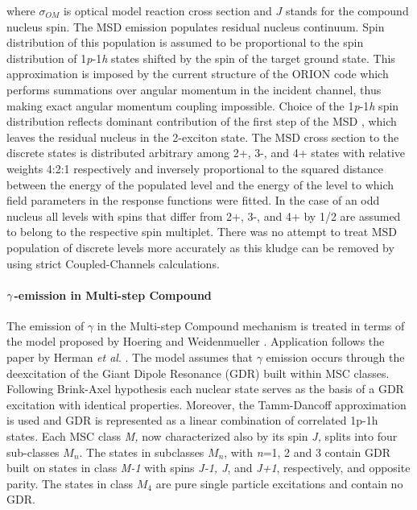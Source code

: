 \noindent where $\sigma_{OM}$ is optical model reaction cross section and $J$
stands for the compound nucleus spin. The MSD%
 emission populates residual nucleus continuum. Spin distribution
of this population is assumed to be proportional to the spin distribution of
1\emph{p}-1\emph{h} states shifted by the spin of the target ground state.
This approximation is imposed by the current structure of the ORION%
 code which performs summations over angular momentum in the
incident channel, thus making exact angular momentum coupling impossible.
Choice of the 1\emph{p}-1\emph{h} spin distribution reflects dominant
contribution of the first step of the MSD%
, which leaves the residual nucleus in the 2-exciton state. The
MSD%
 cross section to the discrete states is distributed arbitrary
among 2+, 3-, and 4+ states with relative weights 4:2:1 respectively and
inversely proportional to the squared distance between the energy of the
populated level and the energy of the level to which field parameters in the
response functions were fitted. In the case of an odd nucleus all levels
with spins that differ from 2+, 3-, and 4+ by 1/2 are assumed to belong to
the respective spin multiplet. There was no attempt to treat MSD%
 population of discrete levels more accurately as this kludge can
be removed by using strict Coupled-Channels calculations.

\medskip

\paragraph{$\protect\gamma$-emission in Multi-step Compound}

The emission of $\gamma$ in the Multi-step Compound%
 mechanism is treated in terms of the model proposed by Hoering
and Weidenmueller \cite{GammaMSC}. Application follows the paper by Herman
\emph{et al}. \cite{GammaMSCapp}. The model assumes that $\gamma$ emission
occurs through the deexcitation of the Giant Dipole Resonance (GDR) built
within MSC%
 classes. Following Brink-Axel hypothesis \cite{Axel,Brink,Brinka}
each nuclear state serves as the basis of a GDR excitation with identical
properties. Moreover, the Tamm-Dancoff approximation is used and GDR is
represented as a linear combination of correlated 1p-1h states. Each MSC
class \emph{M,} now characterized also by its spin \emph{J,} splits into
four sub-classes $M_{n}$. The states in subclasses $M_{n}$, with \emph{n}=1,
2 and 3 contain GDR built on states in class \emph{M-1} with spins \emph{%
J-1, J}, and \emph{J+1}, respectively, and opposite parity. The states in
class $M_{4}$ are pure single particle excitations and contain no GDR.

